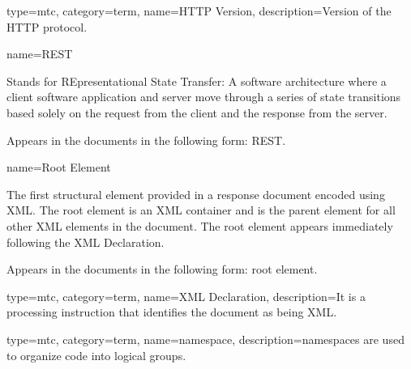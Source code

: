 {
  type=mtc,
  category=term,
  name={HTTP Version},
  description={Version of the HTTP protocol.}
}


{
  name={\normalfont REST}
}
{
	Stands for REpresentational State Transfer:  A software architecture where a client software application and server move through a series of state transitions based solely on the request from the client and the response from the server. 

	Appears in the documents in the following form: REST.
}


{
  name={Root Element}
}
{
	The first \gls{structural element} provided in a \gls{response document} encoded using XML.  The \gls{root element} is an XML container and is the \gls{parent element} for all other XML elements in the document.  The \gls{root element} appears immediately following the XML Declaration.

	Appears in the documents in the following form: \gls{root element}.
}

{
  type=mtc,
  category=term,
  name={XML Declaration},
  description={It is a processing instruction that identifies the document as being XML.}
}

{
  type=mtc,
  category=term,
  name={namespace},
  description={\glspl{namespace} are used to organize code into logical groups.}
}

